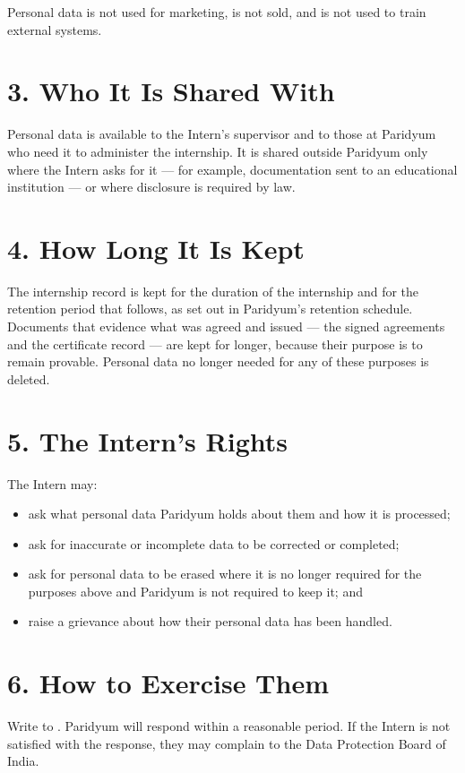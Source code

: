 \documentclass{paridyum}
\begin{document}
Personal data is not used for marketing, is not sold, and is not used to train
external systems.

\section*{3. Who It Is Shared With}
Personal data is available to the Intern's supervisor and to those at Paridyum who
need it to administer the internship. It is shared outside Paridyum only where the
Intern asks for it --- for example, documentation sent to an educational institution
--- or where disclosure is required by law.

\section*{4. How Long It Is Kept}
The internship record is kept for the duration of the internship and for the retention
period that follows, as set out in Paridyum's retention schedule. Documents that
evidence what was agreed and issued --- the signed agreements and the certificate
record --- are kept for longer, because their purpose is to remain provable. Personal
data no longer needed for any of these purposes is deleted.

\section*{5. The Intern's Rights}
The Intern may:
\begin{itemize}[leftmargin=*, noitemsep]
    \item ask what personal data Paridyum holds about them and how it is processed;
    \item ask for inaccurate or incomplete data to be corrected or completed;
    \item ask for personal data to be erased where it is no longer required for the
          purposes above and Paridyum is not required to keep it; and
    \item raise a grievance about how their personal data has been handled.
\end{itemize}

\section*{6. How to Exercise Them}
Write to \textbf{\dkOrgEmail}. Paridyum will respond within a reasonable period. If the
Intern is not satisfied with the response, they may complain to the Data Protection
Board of India.
\end{document}
